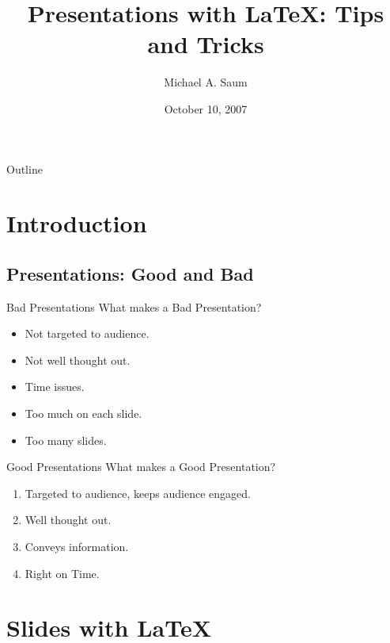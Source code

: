 \documentclass[dvips,11pt]{beamer}
\title[\LaTeX\ Tips and Tricks] 
{%
  Presentations with \LaTeX: Tips and Tricks%
}
\author[Saum]
{
  Michael A. Saum 
}
\institute[Dept of Mathematics, UTK]
{
  Department of Mathematics \\
  The University of Tennessee, Knoxville
}
\date[10/10/07]
{October 10, 2007}
\begin{document}
%
%

\begin{frame}
  \titlepage
{}
\end{frame}

\begin{frame}{Outline}
  \tableofcontents[hideallsubsections]
\end{frame}


\section{Introduction}

\subsection{Presentations: Good and Bad}

\begin{frame}{Bad Presentations}
What makes a \alert{Bad} Presentation?
\begin{itemize}
\item Not targeted to audience.
\item Not well thought out. 
\item Time issues.
\item Too much on each slide.
\item Too many slides.
\end{itemize}
\end{frame}

\begin{frame}{Good Presentations}
What makes a \alert{Good} Presentation?
\begin{enumerate}
\item Targeted to audience, keeps audience engaged.
\item Well thought out.
\item Conveys information.
\item Right on Time.
\end{enumerate}
\end{frame}

\section{Slides with \LaTeX}
\end{document}
